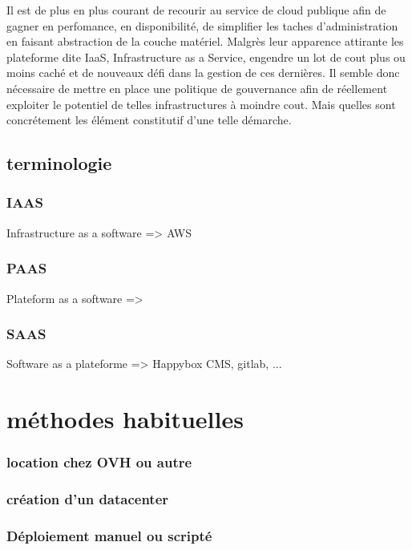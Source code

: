 \documentclass[11pt, a4paper ]{report}
\begin{document}
			Il est de plus en plus courant de recourir au service de cloud publique afin de gagner en perfomance, en disponibilité, de simplifier les taches d'administration en faisant abstraction de la couche matériel. Malgrès leur apparence attirante les plateforme dite IaaS, Infrastructure as a Service, engendre un lot de cout plus ou moins caché et de nouveaux défi dans la gestion de ces dernières. Il semble donc nécessaire de mettre en place une politique de gouvernance afin de réellement exploiter le potentiel de telles infrastructures à moindre cout. Mais quelles sont concrétement les élément constitutif d'une telle démarche.


			\subsection*{terminologie}

				\subsubsection{IAAS}
					Infrastructure as a software => AWS

				\subsubsection{PAAS}
					Plateform as a software =>

				\subsubsection{SAAS}
					Software as a plateforme => Happybox CMS, gitlab, ...

		\section{méthodes habituelles} %
			\subsubsection{location chez OVH ou autre}
			\subsubsection{création d'un datacenter}
			\subsubsection{Déploiement manuel ou scripté}
\end{document}
